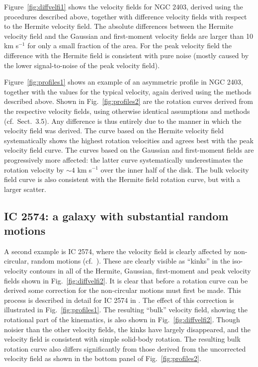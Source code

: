 \documentclass[usenatbib,usegraphicx,apjfonts,floatfix]{emulateapj}
\begin{document}
Figure~\ref{fig:diffvelfi1} shows the velocity fields for NGC 2403,
derived using the procedures described above, together with difference
velocity fields with respect to the Hermite velocity field. The
absolute differences between the Hermite velocity field and the
Gaussian and first-moment velocity fields are larger than 10 km
s$^{-1}$ for only a small fraction of the area. For the peak velocity
field the difference with the Hermite field is consistent with pure
noise (mostly caused by the lower signal-to-noise of the peak velocity
field).

Figure~\ref{fig:profiles1} shows an example of an asymmetric profile
in NGC 2403, together with the values for the typical velocity, again
derived using the methods described above.  Shown in
Fig.~\ref{fig:profiles2} are the rotation curves derived from the
respective velocity fields, using otherwise identical assumptions and
methods (cf.\ Sect.~3.5). Any difference is thus entirely due to the
manner in which the velocity field was derived.  The curve based on
the Hermite velocity field systematically shows the highest rotation
velocities and agrees best with the peak velocity field curve.  The
curves based on the Gaussian and first-moment fields are progressively
more affected: the latter curve systematically underestimates the
rotation velocity by $\sim 4$ km s$^{-1}$ over the inner half of the
disk.  The bulk velocity field curve is also consistent with the
Hermite field rotation curve, but with a larger scatter.

\subsection{IC 2574: a galaxy with substantial random motions}

A second example is IC 2574, where the velocity field is clearly
affected by non-circular, random motions (cf.\ \citealt{walter99}).
These are clearly visible as ``kinks'' in the iso-velocity contours in
all of the Hermite, Gaussian, first-moment and peak velocity fields
shown in Fig.~\ref{fig:diffvelfi2}. It is clear that before a rotation
curve can be derived some correction for the non-circular motions must
first be made. This process is described in detail for IC 2574 in
\citet{oh2007}. The effect of this correction is illustrated in
Fig.~\ref{fig:profiles1}. The resulting ``bulk'' velocity field,
showing the rotational part of the kinematics, is also shown in
Fig.~\ref{fig:diffvelfi2}. Though noisier than the other velocity
fields, the kinks have largely disappeared, and the velocity field is
consistent with simple solid-body rotation.  The resulting bulk
rotation curve also differs significantly from those derived from the
uncorrected velocity field as shown in the bottom panel of
Fig.~\ref{fig:profiles2}.
\end{document}
